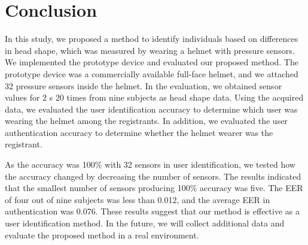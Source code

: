 \documentclass[sigchi,authordraft]{acmart}
\newcommand\figref[1]{\textbf{Figure~\ref{fig:#1}}}
\begin{document}



\section{Conclusion}
\label{sec:conclusion}
In this study, we proposed a method to identify individuals based on differences in head shape, which was measured by wearing a helmet with pressure sensors. We implemented the prototype device and evaluated our proposed method. The prototype device was a commercially available full-face helmet, and we attached 32 pressure sensors inside the helmet. In the evaluation, we obtained sensor values for 2 s 20 times from nine subjects as head shape data. Using the acquired data, we evaluated the user identification accuracy to determine which user was wearing the helmet among the registrants. In addition, we evaluated the user authentication accuracy to determine whether the helmet wearer was the registrant.\par

As the accuracy was 100\% with 32 sensors in user identification, we tested how the accuracy changed by decreasing the number of sensors. The results indicated that the smallest number of sensors producing 100\% accuracy was five. The EER of four out of nine subjects was less than 0.012, and the average EER in authentication was 0.076. These results suggest that our method is effective as a user identification method. In the future, we will collect additional data and evaluate the proposed method in a real environment.
\end{document}

